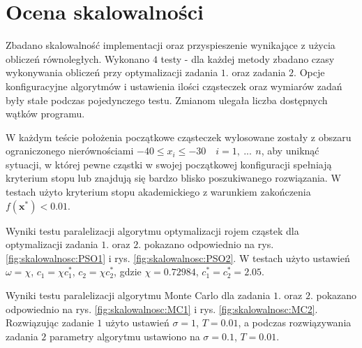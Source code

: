 \documentclass[11pt, a4paper, oneside]{article}
\newcommand{\vect}[1]{\bm{\mathbf{#1}}}
\begin{document}
\section{Ocena skalowalności}

Zbadano skalowalność implementacji oraz przyspieszenie wynikające z użycia obliczeń równoległych. Wykonano $4$ testy - dla każdej metody zbadano czasy wykonywania obliczeń przy optymalizacji zadania $1$. oraz zadania $2$. Opcje konfiguracyjne algorytmów i ustawienia ilości cząsteczek oraz wymiarów zadań były stałe podczas pojedynczego testu. Zmianom ulegała liczba dostępnych wątków programu.

W każdym teście położenia początkowe cząsteczek wylosowane zostały z obszaru ograniczonego nierównościami $-40 \leq x_i \leq -30 \quad i = 1, \ ...\, \ n$, aby uniknąć sytuacji, w której pewne cząstki w swojej początkowej konfiguracji spełniają kryterium stopu lub znajdują się bardzo blisko poszukiwanego rozwiązania. W testach użyto kryterium stopu akademickiego z warunkiem zakończenia $f\left(\vect{x}^{*}\right) < 0.01$.

Wyniki testu paralelizacji algorytmu optymalizacji rojem cząstek dla optymalizacji zadania $1$. oraz $2$. pokazano odpowiednio na rys. \ref{fig:skalowalnosc:PSO1} i rys. \ref{fig:skalowalnosc:PSO2}. W testach użyto ustawień $\omega = \chi$, $c_1 = \chi c_1^*$, $c_2 = \chi c_2^*$, gdzie $\chi = 0.72984$, $c_1^* = c_2^* = 2.05$.

Wyniki testu paralelizacji algorytmu Monte Carlo dla zadania $1$. oraz $2$. pokazano odpowiednio na rys. \ref{fig:skalowalnosc:MC1} i rys. \ref{fig:skalowalnosc:MC2}. Rozwiązując zadanie $1$ użyto ustawień $\sigma = 1$, $T = 0.01$, a podczas rozwiązywania zadania $2$ parametry algorytmu ustawiono na $\sigma = 0.1$, $T = 0.01$.
\end{document}
